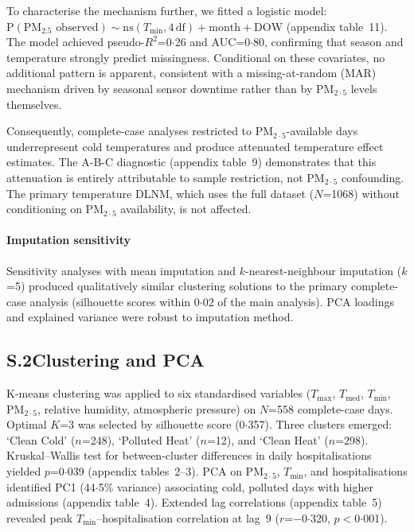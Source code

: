 \documentclass[12pt]{article}
\begin{document}
To characterise the mechanism further, we fitted a logistic model:
$\mathrm{P}(\text{PM}_{2.5}\text{ observed}) \sim
\mathrm{ns}(T_\mathrm{min}, 4\,\text{df}) + \mathrm{month} +
\mathrm{DOW}$ (appendix table~11). The model achieved pseudo-$R^2$=0${\cdot}$26
and AUC=0${\cdot}$80, confirming that season and temperature
strongly predict missingness. Conditional on these covariates, no
additional pattern is apparent, consistent with a missing-at-random
(MAR) mechanism driven by seasonal sensor downtime rather than by
$\text{PM}_{2{\cdot}5}$ levels themselves.

Consequently, complete-case analyses restricted to
$\text{PM}_{2{\cdot}5}$-available days underrepresent cold temperatures and
produce attenuated temperature effect estimates. The A-B-C diagnostic
(appendix table~9) demonstrates that this attenuation is entirely attributable
to sample restriction, not $\text{PM}_{2{\cdot}5}$ confounding. The primary
temperature DLNM, which uses the full dataset ($N$=1068) without
conditioning on $\text{PM}_{2{\cdot}5}$ availability, is not affected.

\paragraph{Imputation sensitivity}
Sensitivity analyses with mean imputation and $k$-nearest-neighbour
imputation ($k$=5) produced qualitatively similar clustering solutions
to the primary complete-case analysis (silhouette scores within
0${\cdot}$02 of the main analysis). PCA loadings and explained
variance were robust to imputation method.

\subsection*{S.2\quad Clustering and PCA}

K-means clustering was applied to six standardised variables
($T_\mathrm{max}$, $T_\mathrm{med}$, $T_\mathrm{min}$,
$\text{PM}_{2{\cdot}5}$, relative humidity, atmospheric pressure) on
$N$=558 complete-case days. Optimal $K$=3 was selected by silhouette
score (0${\cdot}$357). Three clusters emerged: `Clean Cold' ($n$=248),
`Polluted Heat' ($n$=12), and `Clean Heat' ($n$=298). Kruskal--Wallis
test for between-cluster differences in daily hospitalisations
yielded $p$=0${\cdot}$039 (appendix tables~2--3). PCA on $\text{PM}_{2{\cdot}5}$,
$T_\mathrm{min}$, and hospitalisations identified PC1 (44${\cdot}$5\%
variance) associating cold, polluted days with higher admissions
(appendix table~4). Extended lag correlations (appendix table~5) revealed peak
$T_\mathrm{min}$--hospitalisation correlation at lag~9
($r$=$-$0${\cdot}$320, $p$$<$0${\cdot}$001).
\end{document}
